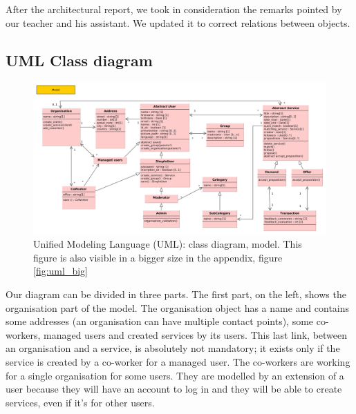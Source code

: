 After the architectural report, we took in consideration the remarks pointed by our teacher and his assistant. We updated it to correct relations between objects. \\

\subsection{UML Class diagram}

\begin{figure}[!ht]
	\begin{center}
		\includegraphics[width=\textwidth]{UML.png}
		\caption{Unified Modeling Language (UML): class diagram, model. This figure is also visible in a bigger size in the appendix, figure \vref{fig:uml_big}}
		\label{fig:uml}
	\end{center}
\end{figure}

Our diagram can be divided in three parts. The first part, on the left, shows the organisation part of the model. The organisation object has a name and contains some addresses (an organisation can have multiple contact points), some co-workers, managed users and created services by its users. This last link, between an organisation and a service, is absolutely not mandatory; it exists only if the service is created by a co-worker for a managed user. The co-workers are working for a single organisation for some users. They are modelled by an extension of a user because they will have an account to log in and they will be able to create services, even if it's for other users.\\

